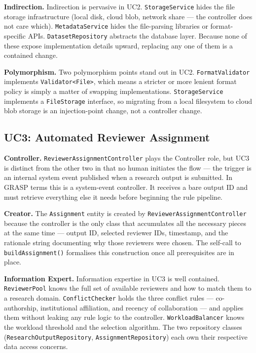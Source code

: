\documentclass[12pt,a4paper]{article}
\newcommand{\code}[1]{\texttt{\small #1}}
\begin{document}
\noindent\textbf{Indirection.}
Indirection is pervasive in UC2. \code{StorageService} hides the file storage infrastructure (local disk, cloud blob, network share --- the controller does not care which). \code{MetadataService} hides the file-parsing libraries or format-specific APIs. \code{DatasetRepository} abstracts the database layer. Because none of these expose implementation details upward, replacing any one of them is a contained change.

\noindent\textbf{Polymorphism.}
Two polymorphism points stand out in UC2. \code{FormatValidator} implements \code{Validator<File>}, which means a stricter or more lenient format policy is simply a matter of swapping implementations. \code{StorageService} implements a \code{FileStorage} interface, so migrating from a local filesystem to cloud blob storage is an injection-point change, not a controller change.

\subsection{UC3: Automated Reviewer Assignment}

\noindent\textbf{Controller.}
\code{ReviewerAssignmentController} plays the Controller role, but UC3 is distinct from the other two in that no human initiates the flow --- the trigger is an internal system event published when a research output is submitted. In GRASP terms this is a system-event controller. It receives a bare output ID and must retrieve everything else it needs before beginning the rule pipeline.

\noindent\textbf{Creator.}
The \code{Assignment} entity is created by \code{ReviewerAssignmentController} because the controller is the only class that accumulates all the necessary pieces at the same time --- output ID, selected reviewer IDs, timestamp, and the rationale string documenting why those reviewers were chosen. The self-call to \code{buildAssignment()} formalises this construction once all prerequisites are in place.

\noindent\textbf{Information Expert.}
Information expertise in UC3 is well contained. \code{ReviewerPool} knows the full set of available reviewers and how to match them to a research domain. \code{ConflictChecker} holds the three conflict rules --- co-authorship, institutional affiliation, and recency of collaboration --- and applies them without leaking any rule logic to the controller. \code{WorkloadBalancer} knows the workload threshold and the selection algorithm. The two repository classes (\code{ResearchOutputRepository}, \code{AssignmentRepository}) each own their respective data access concerns.
\end{document}

